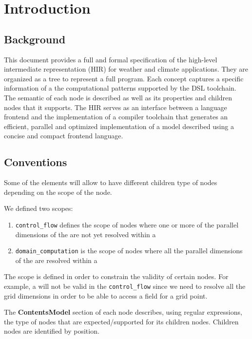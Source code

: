 \section{Introduction}

\subsection{Background}
This document provides a full and formal specification of 
the high-level intermediate representation (HIR) for weather and climate applications.
They
are organized as a tree to represent a full program. 
Each concept captures a specific information of a the computational
patterns supported by the DSL toolchain.
The semantic of each node is described as well as its properties 
and children nodes that it supports. 
The HIR serves as an interface between a language frontend
and the implementation of a compiler toolchain that
generates an efficient, parallel and optimized implementation 
of a model described using a concise and compact frontend language. 

\subsection{Conventions}

Some of the elements will allow to have different children type of nodes depending on the scope of the node.

We defined two scopes: 
\begin{enumerate}
	\item {\tt control\_flow} defines the scope of nodes where one or more of the parallel dimensions of the  are not yet resolved within a 
	\item {\tt domain\_computation} is the scope of nodes where all the parallel dimensions of the  are resolved within a 
\end{enumerate}

The scope is defined in order to constrain the validity of certain nodes.
For example, a  will not be valid in the 
{\tt control\_flow} since we need to resolve all the grid dimensions
in order to be able to access a field for a grid point.


The {\bf ContentsModel} section of each node describes, using regular expressions, the type of nodes that are expected/supported for its children nodes. 
Children nodes are identified by position. 


